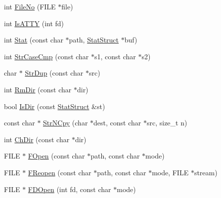 \begin{DoxyCompactItemize}
\item 
int \mbox{\hyperlink{namespacetesting_1_1internal_1_1posix_a3117b067e1f942a2031e666953120ccc}{File\+No}} (F\+I\+LE $\ast$file)
\item 
int \mbox{\hyperlink{namespacetesting_1_1internal_1_1posix_a16ebe936b3a8ea462a94191635aedc27}{Is\+A\+T\+TY}} (int fd)
\item 
int \mbox{\hyperlink{namespacetesting_1_1internal_1_1posix_a2b87b7ff647a128614daf50667eb9304}{Stat}} (const char $\ast$path, \mbox{\hyperlink{namespacetesting_1_1internal_1_1posix_a8eb9f08d3af29941c2d2a964cfff3ecb}{Stat\+Struct}} $\ast$buf)
\item 
int \mbox{\hyperlink{namespacetesting_1_1internal_1_1posix_a1ef2385a7f8e4c706054da35967e76bd}{Str\+Case\+Cmp}} (const char $\ast$s1, const char $\ast$s2)
\item 
char $\ast$ \mbox{\hyperlink{namespacetesting_1_1internal_1_1posix_a8e352884793a65ae8be144676f1a9136}{Str\+Dup}} (const char $\ast$src)
\item 
int \mbox{\hyperlink{namespacetesting_1_1internal_1_1posix_acbad5d4ea5b73fd1765f5f760642932a}{Rm\+Dir}} (const char $\ast$dir)
\item 
bool \mbox{\hyperlink{namespacetesting_1_1internal_1_1posix_af0d04ed5baeed28353fa38742748a421}{Is\+Dir}} (const \mbox{\hyperlink{namespacetesting_1_1internal_1_1posix_a8eb9f08d3af29941c2d2a964cfff3ecb}{Stat\+Struct}} \&st)
\item 
const char $\ast$ \mbox{\hyperlink{namespacetesting_1_1internal_1_1posix_a36fca815713332e5c6dc92c98b6b2574}{Str\+N\+Cpy}} (char $\ast$dest, const char $\ast$src, size\+\_\+t n)
\item 
int \mbox{\hyperlink{namespacetesting_1_1internal_1_1posix_a1ddc8a4fc6bb21da372307485591a212}{Ch\+Dir}} (const char $\ast$dir)
\item 
F\+I\+LE $\ast$ \mbox{\hyperlink{namespacetesting_1_1internal_1_1posix_a4042201dcc4932641d484e7ddf94de7d}{F\+Open}} (const char $\ast$path, const char $\ast$mode)
\item 
F\+I\+LE $\ast$ \mbox{\hyperlink{namespacetesting_1_1internal_1_1posix_a9ef6d089cdae03f9d9e0e6d379c40703}{F\+Reopen}} (const char $\ast$path, const char $\ast$mode, F\+I\+LE $\ast$stream)
\item 
F\+I\+LE $\ast$ \mbox{\hyperlink{namespacetesting_1_1internal_1_1posix_af7c268eba32d5a718b36b6b3801302e0}{F\+D\+Open}} (int fd, const char $\ast$mode)
\item 

\end{DoxyCompactItemize}

